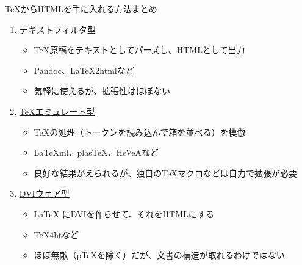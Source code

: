 \begin{frame}[t]{\inhibitglue \TeX{}からHTMLを手に入れる方法まとめ}
  \sffamily

  \begin{enumerate}
    \item[\sffamily\color{black}{１.}] \underline{テキストフィルタ型}\\
    \begin{itemize}
      \item \TeX{}原稿をテキストとしてパーズし、HTMLとして出力
      \item Pandoc、\LaTeX{}2htmlなど
      \item 気軽に使えるが、拡張性はほぼない
    \end{itemize}
    \item[\sffamily\color{black}{２.}] \underline{TeXエミュレート型}\\
    \begin{itemize}
      \item \TeX{}の処理（トークンを読み込んで箱を並べる）を模倣
      \item {\color{shozyohi}\LaTeX{}ml}、plas\TeX{}、HeVeAなど
      \item 良好な結果がえられるが、独自のTeXマクロなどは自力で拡張が必要
    \end{itemize}
    \item[\sffamily\color{black}{３.}] \underline{DVIウェア型}\\
    \begin{itemize}
      \item \LaTeX{} にDVIを作らせて、それをHTMLにする
      \item {\color{shozyohi}\TeX{}4ht}など
      \item ほぼ無敵（p\TeX{}を除く）だが、文書の構造が取れるわけではない
    \end{itemize}
  \end{enumerate}
\end{frame}
